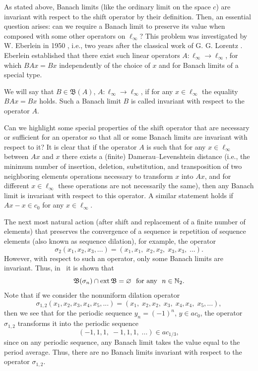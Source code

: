 As stated above, Banach limits (like the ordinary limit on the space $c$)
are invariant with respect to the shift operator by their definition.
Then, an essential question arises: can we require a Banach limit to preserve its value
when composed with some other operators on $\ell_\infty$?
This problem was investigated by W. Eberlein in 1950 \cite{Eberlein},
i.e., two years after the classical work of G. G. Lorentz \cite{lorentz1948contribution}.
Eberlein established that there exist such linear operators $A : \ell_\infty\to \ell_\infty$,
for which $BAx = Bx$ independently of the choice of $x$ and for Banach limits of a special type.

We will say that $B\in\mathfrak B(A)$, $A : \ell_\infty\to \ell_\infty$, if for any $x\in \ell_\infty$
the equality $BAx = Bx$ holds.
Such a Banach limit $B$ is called invariant with respect to the operator $A$.

Can we highlight some special properties of the shift operator
that are necessary or sufficient for an operator so that all or some Banach limits are invariant with respect to it?
It is clear that if the operator $A$ is such that for any $x\in\ell_\infty$ between $Ax$ and $x$
there exists a (finite) Damerau–Levenshtein distance \cite{damerau1964technique}
(i.e., the minimum number of insertion, deletion, substitution,
and transposition of two neighboring elements operations necessary to transform $x$ into $Ax$,
and for different $x\in\ell_\infty$ these operations are not necessarily the same),
then any Banach limit is invariant with respect to this operator.
A similar statement holds if $Ax -x \in c_0$ for any $x\in \ell_\infty$.

The next most natural action (after shift and replacement of a finite number of elements)
that preserves the convergence of a sequence is repetition of sequence elements (also known as sequence dilation),
for example, the operator
\begin{equation}
	\sigma_2(x_1,x_2,x_3,...) = (x_1,x_1, \; x_2, x_2, \; x_3, x_3, \; ...)
	.
\end{equation}
However, with respect to such an operator, only some Banach limits are invariant.
Thus, in~\cite[theorem 14]{alekhno2017order} it is shown that
\begin{equation}
	\mathfrak{B}(\sigma_n) \cap \operatorname{ext} \mathfrak{B} = \varnothing  \mbox{~~for any~~} n\in\mathbb{N}_2
	.
\end{equation}
Note that if we consider the nonuniform dilation operator
\begin{equation}
	\sigma_{1,2}(x_1,x_2,x_3,x_4,x_5,...) = (x_1, \; x_2, x_2, \;  x_3, \; x_4, x_4, \; x_5, ...)
	,
\end{equation}
then we see that for the periodic sequence $y_n = (-1)^n$, $y\in ac_0$, the operator $\sigma_{1,2}$
transforms it into the periodic sequence
\begin{equation}
	(-1, 1, 1, \; -1, 1, 1, \; ...) \in ac_{1/3}
	,
\end{equation}
since on any periodic sequence, any Banach limit takes the value equal to the period average.
Thus, there are no Banach limits invariant with respect to the operator $\sigma_{1,2}$.

